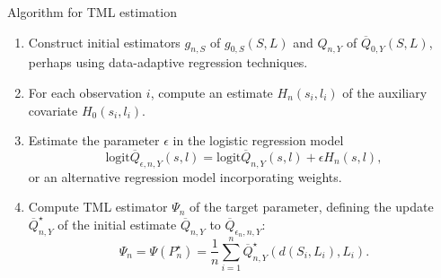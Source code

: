 \documentclass{beamer}
\begin{document}
\begin{frame}[c]{Algorithm for TML estimation}

\begin{center}
\begin{enumerate}\label{tmle_algo}
  \itemsep6pt
  \item Construct initial estimators $g_{n,S}$ of $g_{0,S}(S, L)$ and $Q_{n,Y}$
    of $\overline{Q}_{0,Y}(S, L)$, perhaps using data-adaptive regression
    techniques.
  \item For each observation $i$, compute an estimate $H_n(s_i, l_i)$ of the
    auxiliary covariate $H_0(s_i, l_i)$.
  \item Estimate the parameter $\epsilon$ in the logistic regression model
    $$\text{logit}\overline{Q}_{\epsilon, n, Y}(s, l) =
    \text{logit}\overline{Q}_{n,Y}(s, l) + \epsilon H_n(s, l),$$
    or an alternative regression model incorporating weights.
  \item Compute TML estimator $\Psi_n$ of the target parameter, defining the
    update $\overline{Q}_{n,Y}^{\star}$ of the initial estimate
    $\overline{Q}_{n,Y}$ to $\overline{Q}_{\epsilon_n, n, Y}$:
    \begin{equation*}\label{tmle}
      \Psi_n = \Psi(P_n^{\star}) = \frac{1}{n} \sum_{i = 1}^n
        \overline{Q}_{n,Y}^{\star}(d(S_i, L_i), L_i).
      \end{equation*}
\end{enumerate}
\end{center}


\end{frame}

\end{document}
